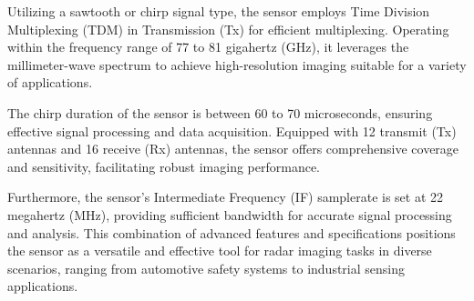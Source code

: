 Utilizing a sawtooth or chirp signal type, the sensor employs Time Division Multiplexing (TDM) in Transmission (Tx) for efficient multiplexing.
Operating within the frequency range of 77 to 81 gigahertz (GHz),
it leverages the millimeter-wave spectrum to achieve high-resolution imaging suitable for a variety of applications.

The chirp duration of the sensor is between 60 to 70 microseconds, ensuring effective signal processing and data acquisition.
Equipped with 12 transmit (Tx) antennas and 16 receive (Rx) antennas, the sensor offers comprehensive coverage and sensitivity,
facilitating robust imaging performance.

Furthermore, the sensor's Intermediate Frequency (IF) samplerate is set at 22 megahertz (MHz),
providing sufficient bandwidth for accurate signal processing and analysis.
This combination of advanced features and specifications positions the sensor as a versatile and effective tool for radar imaging tasks in diverse scenarios,
ranging from automotive safety systems to industrial sensing applications.
